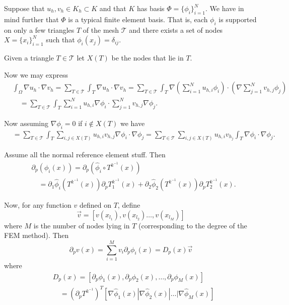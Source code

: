 \documentclass{article}
\newcommand{\T}{\mathcal{T}}
\renewcommand{\v}{\vec}
\begin{document}
Suppose that $u_h,v_h\in K_h \subset K$ and that $K$ has basis
$\Phi=\{\phi_i\}_{i=1}^N$.  We have in mind further that $\Phi$ is a
typical finite element basis.  That is, each $\phi_i$ is supported on
only a few triangles $T$ of the mesh $\mathcal{T}$ and there exists a
set of nodes $X=\{x_i\}_{i=1}^N$ such that $\phi_i(x_j)=\delta_{ij}$. 

Given a triangle $T\in \T$ let $X(T)$ be the nodes that lie in $T$. 

Now we may express 
\begin{align}
  &\int_\Omega \nabla u_h\cdot \nabla v_h=\sum_{T\in\T}\int_T\nabla
  u_h\cdot \nabla v_h=\sum_{T \in \T} \int_T \nabla \left(\sum_{i=1}^N
  u_{h,i}\phi_i\right) \cdot \left(\nabla \sum_{j=1}^N v_{h,j}\phi_j\right)\\
  &\quad=\sum_{T\in \T} \int_T \sum_{i=1}^N u_{h,i}\nabla \phi_i \cdot
  \sum_{j=1}^N v_{h,j}\nabla \phi_j.
\end{align}

Now assuming $\nabla \phi_i=0$ if $i\notin X(T)$ we have
\begin{align}
  &=\sum_{T\in \T}\int_T\sum_{i,j\in X(T)}u_{h,i}v_{h,j}\nabla \phi_i
  \cdot \nabla \phi_j=\sum_{T\in\T}\sum_{i,j\in
    X(T)}u_{h,i}v_{h_j}\int_T \nabla \phi_i\cdot \nabla\phi_j.
\end{align}

Assume all the normal reference element stuff.  Then
\begin{align*}
&\partial_p\left(\phi_i(x)\right)=\partial_p\left(\hat{\phi}_i\circ T^{k^{-1}}(x)\right)\\
&\quad=\partial_1\hat{\phi}_i(T^{k^{-1}}(x))\partial_pT^{k^{-1}}_1(x)+\partial_2\hat{\phi}_2(T^{k^{-1}}(x))\partial_pT^{k^{-1}}_2(x).
\end{align*}

Now, for any function $v$ defined on $T$, define 
\[\v v=[v(x_{l_1}),v(x_{l_2})\dots,v(x_{l_M})]\]
where $M$ is the number of nodes lying in $T$ (corresponding to the
degree of the FEM method).  Then
\[\partial_p v(x)=\sum_{i=1}^Mv_i\partial_p\phi_i(x)=D_p(x) \v v\]
where
\begin{align*}
&D_p(x)=[\partial_p\phi_1(x),\partial_p\phi_2(x),\dots,\partial_p\phi_M(x)]\\
&\quad =\left(\partial_pT^{k^{-1}}\right)^T[\nabla \hat{\phi}_1(x)|\nabla\hat{\phi}_2(x)|\dots|\nabla\hat{\phi}_M(x)]
\end{align*}
\end{document}
